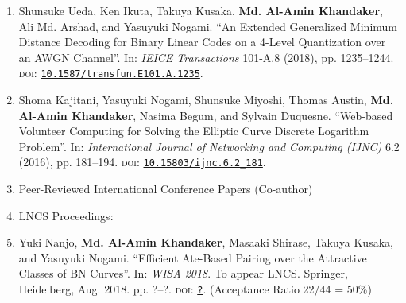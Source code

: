 \begin{enumerate}
	\item Shunsuke Ueda, Ken Ikuta, Takuya Kusaka, \textbf{Md. Al-Amin Khandaker}, Ali Md. Arshad, and Yasuyuki Nogami. ``An Extended Generalized Minimum Distance Decoding for Binary Linear Codes on a 4-Level Quantization over an AWGN Channel”. In: \textit{IEICE Transactions} 101-A.8 (2018), pp. 1235–1244. \textsc{doi}: \href{https://doi.org/10.1587/transfun.E101.A.1235}{\texttt{10.1587/transfun.E101.A.1235}}.
	
	\item Shoma Kajitani, Yasuyuki Nogami, Shunsuke Miyoshi, Thomas Austin, \textbf{Md. Al-Amin Khandaker}, Nasima Begum, and Sylvain Duquesne. “Web-based Volunteer Computing for Solving the Elliptic Curve Discrete Logarithm Problem”. In: \textit{International Journal of Networking and Computing (IJNC) }6.2 (2016), pp. 181–194. \textsc{doi}: \href{https://doi.org/10.15803/ijnc.6.2_181}{\texttt{10.15803/ijnc.6.2\_181}}.
	
\vspace{10mm}
	\Large
	\item[] Peer-Reviewed International Conference Papers  (Co-author)
	\item[ ] \Large LNCS Proceedings:
	\normalsize
	\item Yuki Nanjo, \textbf{Md. Al-Amin Khandaker}, Masaaki Shirase, Takuya Kusaka, and Yasuyuki Nogami. ``Efficient Ate-Based Pairing over the Attractive Classes of BN Curves''. In: \textit{WISA 2018}. To appear LNCS. Springer, Heidelberg,  Aug. 2018.  pp. ?–?. \textsc{doi}: \href{?}{\texttt{?}}. (Acceptance Ratio 22/44 = 50\%)
	

\end{enumerate}

